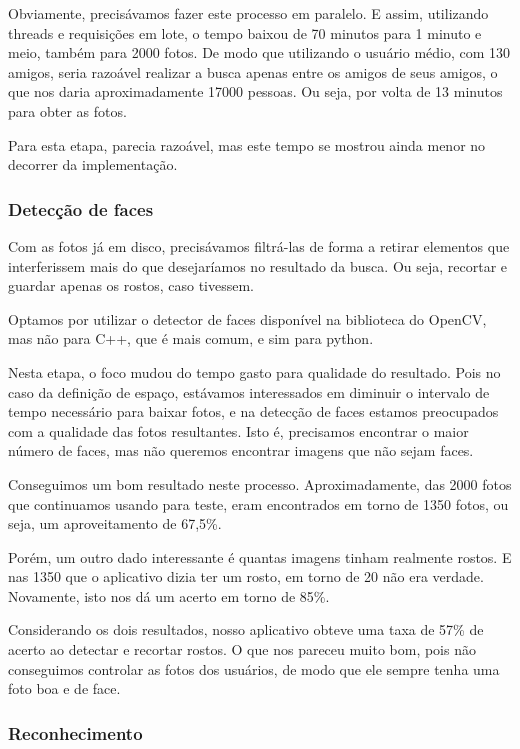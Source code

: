 \documentclass[10pt,a4paper]{article}
\begin{document}
	Obviamente, precisávamos fazer este processo em paralelo. E assim, utilizando threads e requisições em lote, o tempo baixou de 70 minutos para 1 minuto e meio, também para 2000 fotos. De modo que utilizando o usuário médio, com 130 amigos, seria razoável realizar a busca apenas entre os amigos de seus amigos, o que nos daria aproximadamente 17000 pessoas. Ou seja, por volta de 13 minutos para obter as fotos.

Para esta etapa, parecia razoável, mas este tempo se mostrou ainda
menor no decorrer da implementação.

\subsubsection*{Detecção de faces} %

	Com as fotos já em disco, precisávamos filtrá-las de forma a retirar elementos que interferissem mais do que desejaríamos no resultado da busca. Ou seja, recortar e guardar apenas os rostos, caso tivessem.

	Optamos por utilizar o detector de faces disponível na biblioteca do OpenCV, mas não para C++, que é mais comum, e sim para python.

	Nesta etapa, o foco mudou do tempo gasto para qualidade do resultado. Pois no caso da definição de espaço, estávamos interessados em diminuir o intervalo de tempo necessário para baixar fotos, e na detecção de faces estamos preocupados com a qualidade das fotos resultantes. Isto é, precisamos encontrar o maior número de faces, mas não queremos encontrar imagens que não sejam faces.

	Conseguimos um bom resultado neste processo. Aproximadamente, das 2000 fotos que continuamos usando para teste, eram encontrados em torno de 1350 fotos, ou seja, um aproveitamento de 67,5\%.

	Porém, um outro dado interessante é quantas imagens tinham realmente rostos. E nas 1350 que o aplicativo dizia ter um rosto, em torno de 20 não era verdade. Novamente, isto nos dá um acerto em torno de 85\%.

	Considerando os dois resultados, nosso aplicativo obteve uma taxa de 57\% de acerto ao detectar e recortar rostos. O que nos pareceu muito bom, pois não conseguimos controlar as fotos dos usuários, de modo que ele sempre tenha uma foto boa e de face.


\subsubsection*{Reconhecimento}
\end{document}
